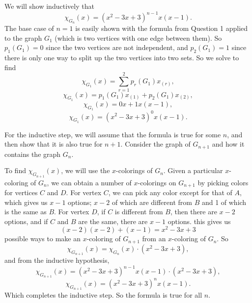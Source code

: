\documentclass[12pt]{article}
\begin{document}
We will show inductively that
\[\chi_{G_n}(x) = (x^2 - 3x + 3)^{n-1}x(x-1).\]
The base case of $n=1$ is easily shown with the formula from Question 1 applied to the graph $G_1$ (which is two vertices with one edge between them). So $p_1(G_1)=0$ since the two vertices are not independent, and $p_2(G_1)=1$ since there is only one way to split up the two vertices into two sets. So we solve to find
\[\chi_{G_1}(x) = \sum_{r=1}^2p_r(G_1)x_{(r)},\]
\[\chi_{G_1}(x) = p_1(G_1)x_{(1)} + p_2(G_1)x_{(2)},\]
\[\chi_{G_1}(x) = 0x + 1x(x-1),\]
\[\chi_{G_1}(x) = (x^2-3x+3)^0x(x-1).\]

For the inductive step, we will assume that the formula is true for some $n$, and then show that it is also true for $n+1$. Consider the graph of $G_{n+1}$ and how it contains the graph $G_n$.

\begin{center}
\end{center}

To find $\chi_{G_{n+1}}(x)$, we will use the $x$-colorings of $G_n$. Given a particular $x$-coloring of $G_n$, we can obtain a number of $x$-colorings on $G_{n+1}$ by picking colors for vertices $C$ and $D$. For vertex $C$, we can pick any color except for that of $A$, which gives us $x-1$ options; $x-2$ of which are different from $B$ and 1 of which is the same as $B$. For vertex $D$, if $C$ is different from $B$, then there are $x-2$ options, and if $C$ and $B$ are the same, there are $x-1$ options. this gives us
\[(x-2)(x-2) + (x-1) = x^2 - 3x + 3\]
possible ways to make an $x$-coloring of $G_{n+1}$ from an $x$-coloring of $G_n$. So
\[\chi_{G_{n+1}}(x) = \chi_{G_n}(x) \cdot (x^2 - 3x + 3),\]
and from the inductive hypothesis,
\[\chi_{G_{n+1}}(x) = (x^2 - 3x + 3)^{n-1}x(x-1) \cdot (x^2 - 3x + 3),\]
\[\chi_{G_{n+1}}(x) = (x^2 - 3x + 3)^nx(x-1).\]
Which completes the inductive step. So the formula is true for all $n$.
\end{document}
